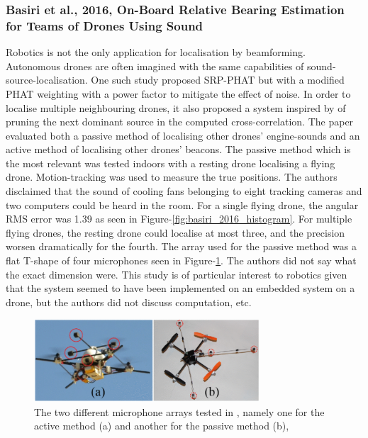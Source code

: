 \documentclass{report}
\begin{document}
\subsubsection{Basiri et al., 2016, On-Board Relative Bearing Estimation for Teams of Drones Using Sound}

Robotics is not the only application for localisation by beamforming. Autonomous drones are often imagined with the same capabilities of sound-source-localisation. One such study \cite{basiri_-board_2016} proposed SRP-PHAT but with a modified PHAT weighting with a power factor to mitigate the effect of noise. In order to localise multiple neighbouring drones, it also proposed a system inspired by \cite{brutti_multiple_2010} of pruning the next dominant source in the computed cross-correlation. The paper evaluated both a passive method of localising other drones' engine-sounds and an active method of localising other drones' beacons. The passive method which is the most relevant was tested indoors with a resting drone localising a flying drone. Motion-tracking was used to measure the true positions. The authors disclaimed that the sound of cooling fans belonging to eight tracking cameras and two computers could be heard in the room. For a single flying drone, the angular RMS error was 1.39 \si{\deg} as seen in Figure-\ref{fig:basiri_2016_histogram}. For multiple flying drones, the resting drone could localise at most three, and the precision worsen dramatically for the fourth. The array used for the passive method was a flat T-shape of four microphones seen in Figure-\ref{fig:basiri_2016_array}. The authors did not say what the exact dimension were. This study is of particular interest to robotics given that the system seemed to have been implemented on an embedded system on a drone, but the authors did not discuss computation, etc.

\begin{figure}[H]
\includegraphics[width=0.75\textwidth]{./basiri_2016/array.png}
\centering
\caption{The two different microphone arrays tested in \cite{basiri_-board_2016}, namely one for the active method (a) and another for the passive method (b),}
\label{fig:basiri_2016_array}
\centering
\end{figure}
\end{document}
